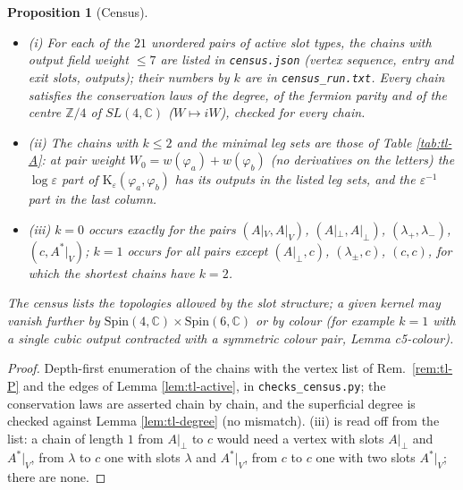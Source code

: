 \documentclass[11pt]{article}
\numberwithin{equation}{section}
\theoremstyle{plain}
\newtheorem{proposition}[theorem]{Proposition}
\theoremstyle{definition}
\begin{document}
\begin{proposition}[Census]
\label{prop:tl-census}
\begin{itemize}
\item (i) For each of the $21$ unordered pairs of active slot types, the chains with output field weight $\le7$ are listed in \texttt{census.json} (vertex sequence, entry and exit slots, outputs); their numbers by $k$ are in \texttt{census\_run.txt}. Every chain satisfies the conservation laws of the degree, of the fermion parity and of the centre $\mathbb Z/4$ of $SL(4,\mathbb C)$ ($W\mapsto iW$), checked for every chain.
\item (ii) The chains with $k\le2$ and the minimal leg sets are those of Table \ref{tab:tl-A}: at pair weight $W_0=w(\varphi_a)+w(\varphi_b)$ (no derivatives on the letters) the $\log\varepsilon$ part of $\mathrm K_\varepsilon(\varphi_a,\varphi_b)$ has its outputs in the listed leg sets, and the $\varepsilon^{-1}$ part in the last column.
\item (iii) $k=0$ occurs exactly for the pairs $(A|_V,A|_V)$, $(A|_\perp,A|_\perp)$, $(\lambda_+,\lambda_-)$, $(c,A^*|_V)$; $k=1$ occurs for all pairs except $(A|_\perp,c)$, $(\lambda_\pm,c)$, $(c,c)$, for which the shortest chains have $k=2$.
\end{itemize}
The census lists the topologies allowed by the slot structure; a given kernel may vanish further by $\mathrm{Spin}(4,\mathbb C)\times\mathrm{Spin}(6,\mathbb C)$ or by colour (for example $k=1$ with a single cubic output contracted with a symmetric colour pair, Lemma c5-colour).
\end{proposition}

\begin{proof}
Depth-first enumeration of the chains with the vertex list of Rem.~\ref{rem:tl-P} and the edges of Lemma \ref{lem:tl-active}, in \texttt{checks\_census.py}; the conservation laws are asserted chain by chain, and the superficial degree is checked against Lemma \ref{lem:tl-degree} (no mismatch). (iii) is read off from the list: a chain of length $1$ from $A|_\perp$ to $c$ would need a vertex with slots $A|_\perp$ and $A^*|_V$, from $\lambda$ to $c$ one with slots $\lambda$ and $A^*|_V$, from $c$ to $c$ one with two slots $A^*|_V$; there are none.
\end{proof}
\end{document}

